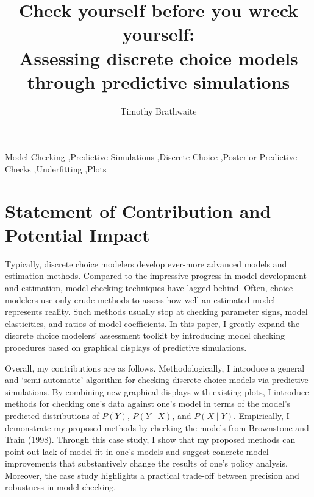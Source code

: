 \documentclass[preprint]{elsarticle}
\begin{document}
\begin{frontmatter}

\title{Check yourself before you wreck yourself: \\Assessing discrete choice models through predictive simulations}

\author[tbrathwaite]{Timothy Brathwaite}


\address[tbrathwaite]{Lyft Inc.\\ 185 Berry Street, Suite 5000, San Francisco, CA, 94107}


\begin{keyword}
Model Checking \sep Predictive Simulations \sep Discrete Choice \sep Posterior Predictive Checks \sep Underfitting \sep Plots
\end{keyword}

\end{frontmatter}

\section{Statement of Contribution and Potential Impact}
Typically, discrete choice modelers develop ever-more advanced models and estimation methods. Compared to the impressive progress in model development and estimation, model-checking techniques have lagged behind. Often, choice modelers use only crude methods to assess how well an estimated model represents reality. Such methods usually stop at checking parameter signs, model elasticities, and ratios of model coefficients. In this paper, I greatly expand the discrete choice modelers' assessment toolkit by introducing model checking procedures based on graphical displays of predictive simulations. 

Overall, my contributions are as follows. Methodologically, I introduce a general and `semi-automatic' algorithm for checking discrete choice models via predictive simulations. By combining new graphical displays with existing plots, I introduce methods for checking one's data against one's model in terms of the model's predicted distributions of $P \left( Y \right)$, $P \left( Y \mid X \right)$, and $P \left( X \mid Y \right)$. Empirically, I demonstrate my proposed methods by checking the models from Brownstone and Train (1998). Through this case study, I show that my proposed methods can point out lack-of-model-fit in one's models and suggest concrete model improvements that substantively change the results of one's policy analysis. Moreover, the case study highlights a practical trade-off between precision and robustness in model checking.
\end{document}
